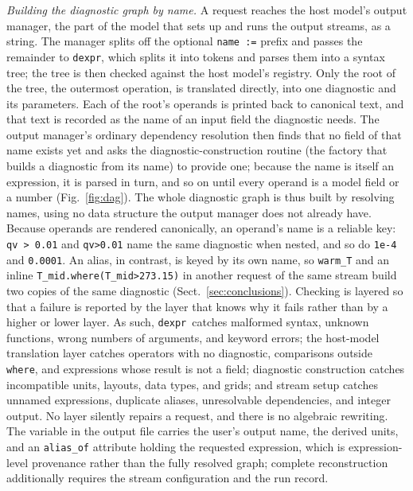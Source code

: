 \documentclass[gmd, manuscript]{copernicus}
\newcommand{\dexpr}{\texttt{dexpr}}
\newcommand{\bk}{\discretionary{}{}{}}
\begin{document}
\emph{Building the diagnostic graph by name.} A request reaches the host model's output manager, the part of the model that sets up and runs the output streams, as a string. The manager splits off the optional \texttt{name :=} prefix and passes the remainder to \dexpr, which splits it into tokens and parses them into a syntax tree; the tree is then checked against the host model's registry. Only the root of the tree, the outermost operation, is translated directly, into one diagnostic and its parameters. Each of the root's operands is printed back to canonical text, and that text is recorded as the name of an input field the diagnostic needs. The output manager's ordinary dependency resolution then finds that no field of that name exists yet and asks the diagnostic-construction routine (the factory that builds a diagnostic from its name) to provide one; because the name is itself an expression, it is parsed in turn, and so on until every operand is a model field or a number (Fig.~\ref{fig:dag}). The whole diagnostic graph is thus built by resolving names, using no data structure the output manager does not already have. Because operands are rendered canonically, an operand's name is a reliable key: \texttt{qv > 0.01} and \texttt{qv>0.01} name the same diagnostic when nested, and so do \texttt{1e-4} and \texttt{0.0001}. An alias, in contrast, is keyed by its own name, so \texttt{warm\_T} and an inline \texttt{T\_mid.\bk where(T\_mid>273.15)} in another request of the same stream build two copies of the same diagnostic (Sect.~\ref{sec:conclusions}). Checking is layered so that a failure is reported by the layer that knows why it fails rather than by a higher or lower layer. As such, \dexpr\ catches malformed syntax, unknown functions, wrong numbers of arguments, and keyword errors; the host-model translation layer catches operators with no diagnostic, comparisons outside \texttt{where}, and expressions whose result is not a field; diagnostic construction catches incompatible units, layouts, data types, and grids; and stream setup catches unnamed expressions, duplicate aliases, unresolvable dependencies, and integer output. No layer silently repairs a request, and there is no algebraic rewriting. The variable in the output file carries the user's output name, the derived units, and an \texttt{alias\_of} attribute holding the requested expression, which is expression-level provenance rather than the fully resolved graph; complete reconstruction additionally requires the stream configuration and the run record.
\end{document}

